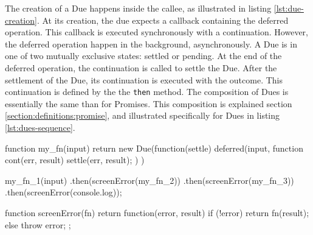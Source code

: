 The creation of a Due happens inside the callee, as illustrated in listing \ref{lst:due-creation}.
At its creation, the due expects a callback containing the deferred operation.
This callback is executed synchronously with a continuation.
However, the deferred operation happen in the background, asynchronously.
A Due is in one of two mutually exclusive states: settled or pending.
At the end of the deferred operation, the continuation is called to settle the Due.
After the settlement of the Due, its continuation is executed with the outcome.
This continuation is defined by the the \texttt{then} method.
The composition of Dues is essentially the same than for Promises.
This composition is explained section \ref{section:definitions:promise}, and illustrated specifically for Dues in listing \ref{lst:dues-sequence}.

\begin{code}[js, %
             caption={Creation of a due}, %
             label={lst:due-creation}] %
function my_fn(input) {
  return new Due(function(settle) {
    deferred(input, function cont(err, result) {
      settle(err, result);
    })
  })
}
\end{code}


\begin{code}[js, %
             caption={Dues are chained like Promises}, %
             label={lst:dues-sequence}] %
my_fn_1(input)
.then(screenError(my_fn_2))
.then(screenError(my_fn_3))
.then(screenError(console.log));

function screenError(fn) {
  return function(error, result) {
    if (!error) {
      return fn(result);
    } else {
      throw error;
    }
  };
}
\end{code}